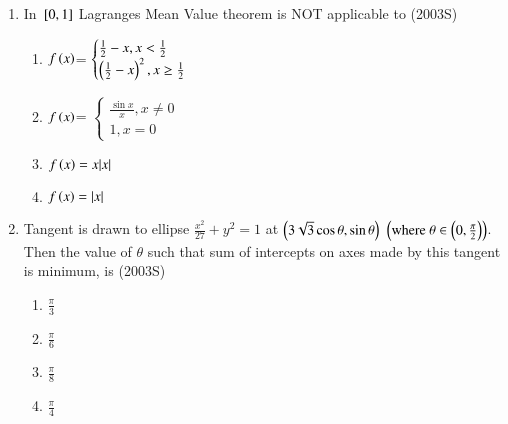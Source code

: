 \documentclass[journal,12pt,twocolumn]{IEEEtran}
\theoremstyle{remark}
\begin{document}
\begin{enumerate}[start=9]
\item In ${}\left[0,1\right]$ Lagranges Mean Value theorem is NOT applicable to
\hfill (2003S)

\begin{enumerate}
    \item $f\left(x\right)$=
    $\begin{cases}
         \frac{1}{2}-x, x<\frac{1}{2}\\
	    \left(\frac{1}{2}-x\right)^2, x\geq \frac{1}{2}
    \end{cases}$\\
    \item $f\left(x\right)$=
    $\begin{cases}
	    \frac{\sin{x}}{x}, x\neq 0\\
        1, x=0
    \end{cases}$\\
    \item $f\left(x\right)=x|x|$
    \item $f\left(x\right)=|x|$\\
\end{enumerate}
\item Tangent is drawn to ellipse $\frac{x^2}{27}+y^2 = 1$ at $\left(3\sqrt{3}\cos{\theta},\sin{\theta}\right)$ $\left(\text{where}\ \theta \in \left(0,\frac{\pi}{2}\right)\right)$. Then the value of $\theta$ such that sum of intercepts on axes made by this tangent is minimum, is
\hfill (2003S)
\begin{enumerate}
    \item $\frac{\pi}{3}$\\
    \item $\frac{\pi}{6}$\\
    \item $\frac{\pi}{8}$\\
    \item $\frac{\pi}{4}$\\
 \end{enumerate}
\end{enumerate}
\end{document}
